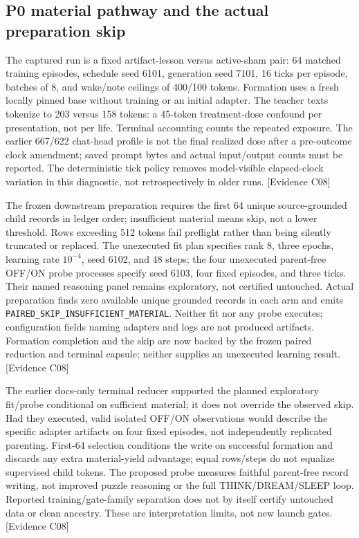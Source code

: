 \documentclass[11pt]{article}
\newcommand{\ev}[1]{\textsf{[Evidence #1]}}
\begin{document}
\subsection{P0 material pathway and the actual preparation skip}
The captured run is a fixed artifact-lesson versus active-sham pair: 64 matched
training episodes, schedule seed 6101, generation seed 7101, 16 ticks per episode,
batches of 8, and wake/note ceilings of 400/100 tokens. Formation uses a fresh
locally pinned base without training or an initial adapter. The teacher texts
tokenize to 203 versus 158 tokens: a 45-token treatment-dose confound per
presentation, not per life. Terminal accounting counts the repeated exposure.
The earlier
667/622 chat-head profile is not the final realized dose after a pre-outcome clock
amendment; saved prompt bytes and actual input/output counts must be reported.
The deterministic tick policy removes model-visible elapsed-clock variation in
this diagnostic, not retrospectively in older runs. \ev{C08}

The frozen downstream preparation requires the first 64 unique source-grounded child
records in ledger order; insufficient material means skip, not a lower threshold.
Rows exceeding 512 tokens fail preflight rather than being silently truncated or
replaced. The unexecuted fit plan specifies rank 8, three epochs, learning rate
$10^{-4}$, seed 6102, and 48 steps; the four unexecuted parent-free OFF/ON probe
processes specify seed 6103, four fixed episodes, and three ticks. Their named
reasoning panel remains exploratory, not certified untouched. Actual preparation
finds zero available unique grounded records in each arm and emits
\texttt{PAIRED\_SKIP\_INSUFFICIENT\_MATERIAL}. Neither fit nor any probe executes;
configuration fields naming adapters and logs are not produced artifacts.
Formation completion and the skip are now backed by the frozen paired reduction
and terminal capsule; neither supplies an unexecuted learning result. \ev{C08}

The earlier docs-only terminal reducer supported the planned exploratory
fit/probe conditional on sufficient material; it does not override the observed
skip. Had they executed, valid isolated OFF/ON observations would describe the
specific adapter artifacts on four fixed episodes, not independently replicated
parenting. First-64 selection conditions the write on successful formation and
discards any extra material-yield advantage; equal rows/steps do not equalize
supervised child tokens. The proposed probe measures faithful parent-free record writing,
not improved puzzle reasoning or the full THINK/DREAM/SLEEP loop. Reported
training/gate-family separation does not by itself certify untouched data or
clean ancestry. These are interpretation limits, not new launch gates. \ev{C08}
\end{document}
